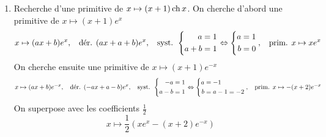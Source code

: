 \begin{enumerate}
\item Recherche d'une primitive de $x\mapsto (x+1) \mathop{\mathrm{ch}} x$. \newline
On cherche d'abord une primitive de $x \mapsto (x+1) e^{x}$ 
\begin{displaymath}
  x \mapsto (ax+b)e^{x},\hspace{.2cm}\text{ dér. } (ax+a+b)e^{x},\hspace{.2cm}\text{ syst. }
  \left\lbrace 
  \begin{aligned}
    a &= 1 \\ a+b & = 1
  \end{aligned}
  \right. \Leftrightarrow
  \left\lbrace 
  \begin{aligned}
    a &= 1 \\ b &= 0
  \end{aligned}
   \right. 
   ,\hspace{.2cm}\text{ prim. } x\mapsto xe^x
\end{displaymath}
On cherche ensuite une primitive de $x \mapsto (x+1) e^{-x}$  
\begin{displaymath}
  x \mapsto (ax+b)e^{-x},\hspace{.2cm}\text{ dér. } (-ax+a-b)e^{x},\hspace{.2cm}\text{ syst. }
  \left\lbrace 
  \begin{aligned}
    -a &= 1 \\ a - b & = 1
  \end{aligned}
  \right. \Leftrightarrow
  \left\lbrace 
  \begin{aligned}
    a &= -1 \\ b &= a-1 = -2
  \end{aligned}
   \right. 
   ,\hspace{.2cm}\text{ prim. } x\mapsto -(x+2)e^{-x}
\end{displaymath}
On superpose avec les coefficients $\frac{1}{2}$
\begin{displaymath}
  x \mapsto \frac{1}{2}\left( xe^{x} - (x+2)e^{-x}\right) 
\end{displaymath}
\end{enumerate}

